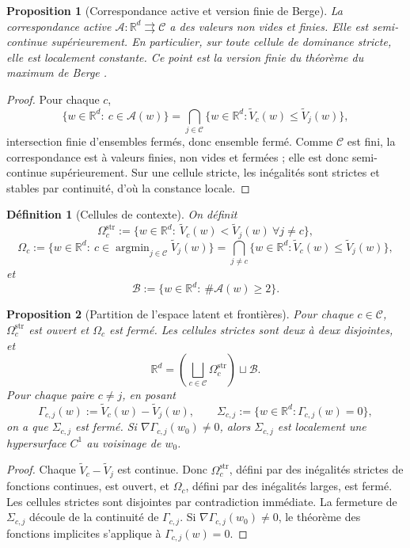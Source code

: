 \documentclass[11pt,a4paper]{article}
\newtheorem{definition}{Définition}[section]
\newtheorem{proposition}{Proposition}[section]
\DeclareMathOperator{\argmin}{argmin}
\newcommand{\R}{\mathbb R}
\newcommand{\Ccal}{\mathcal C}
\newcommand{\Acal}{\mathcal A}
\newcommand{\Bcal}{\mathcal B}
\begin{document}
\begin{proposition}[Correspondance active et version finie de Berge]
La correspondance active \(\Acal:\R^d\rightrightarrows\Ccal\) a des valeurs non vides et finies. Elle est semi-continue supérieurement. En particulier, sur toute cellule de dominance stricte, elle est localement constante. Ce point est la version finie du théorème du maximum de Berge \cite{Berge1963}.
\end{proposition}

\begin{proof}
Pour chaque \(c\),
\[
\{w\in\R^d:\ c\in\Acal(w)\}
=
\bigcap_{j\in\Ccal}\{w\in\R^d:\widetilde V_c(w)\le \widetilde V_j(w)\},
\]
intersection finie d'ensembles fermés, donc ensemble fermé. Comme \(\Ccal\) est fini, la correspondance est à valeurs finies, non vides et fermées ; elle est donc semi-continue supérieurement. Sur une cellule stricte, les inégalités sont strictes et stables par continuité, d'où la constance locale.
\end{proof}

\begin{definition}[Cellules de contexte]
On définit
\[
\Omega_c^{\mathrm{str}}:=\{w\in\R^d:\ \widetilde V_c(w)<\widetilde V_j(w)\ \forall j\neq c\},
\]
\[
\Omega_c:=\{w\in\R^d:\ c\in\argmin_{j\in\Ccal}\widetilde V_j(w)\}
=\bigcap_{j\neq c}\{w\in\R^d:\widetilde V_c(w)\le \widetilde V_j(w)\},
\]
et
\[
\Bcal:=\{w\in\R^d:\ \#\Acal(w)\ge 2\}.
\]
\end{definition}

\begin{proposition}[Partition de l'espace latent et frontières]
Pour chaque \(c\in\Ccal\), \(\Omega_c^{\mathrm{str}}\) est ouvert et \(\Omega_c\) est fermé. Les cellules strictes sont deux à deux disjointes, et
\[
\R^d=\left(\bigsqcup_{c\in\Ccal}\Omega_c^{\mathrm{str}}\right)\sqcup \Bcal.
\]
Pour chaque paire \(c\neq j\), en posant
\[
\Gamma_{c,j}(w):=\widetilde V_c(w)-\widetilde V_j(w),
\qquad
\Sigma_{c,j}:=\{w\in\R^d:\Gamma_{c,j}(w)=0\},
\]
on a que \(\Sigma_{c,j}\) est fermé. Si \(\nabla\Gamma_{c,j}(w_0)\neq 0\), alors \(\Sigma_{c,j}\) est localement une hypersurface \(C^1\) au voisinage de \(w_0\).
\end{proposition}

\begin{proof}
Chaque \(\widetilde V_c-\widetilde V_j\) est continue. Donc \(\Omega_c^{\mathrm{str}}\), défini par des inégalités strictes de fonctions continues, est ouvert, et \(\Omega_c\), défini par des inégalités larges, est fermé. Les cellules strictes sont disjointes par contradiction immédiate. La fermeture de \(\Sigma_{c,j}\) découle de la continuité de \(\Gamma_{c,j}\). Si \(\nabla\Gamma_{c,j}(w_0)\neq 0\), le théorème des fonctions implicites s'applique à \(\Gamma_{c,j}(w)=0\).
\end{proof}
\end{document}
